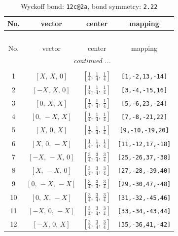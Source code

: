\documentclass[fleqn,8pt]{jsarticle}
\begin{document}
\begin{longtable}{cccc}
\caption{Wyckoff bond: {\tt 12c@2a}, bond symmetry: {\tt 2.22}}
 \\
 \hline \hline
No. & vector & center & mapping \\ \hline \endfirsthead

\multicolumn{3}{l}{\tablename\ \thetable{}} \\
 \hline \hline
No. & vector & center & mapping \\ \hline \endhead

 \hline \hline
\multicolumn{3}{r}{\footnotesize\it continued ...} \\ \endfoot

 \hline \hline
\multicolumn{3}{r}{} \\ \endlastfoot

1 & $\left[ X,\, X,\, 0 \right]$ & $\left[ \frac{1}{4},\, \frac{1}{4},\, \frac{1}{4} \right]$ & {\tt [1,-2,13,-14]} \\ \hline
2 & $\left[ - X,\, X,\, 0 \right]$ & $\left[ \frac{1}{4},\, \frac{1}{4},\, \frac{1}{4} \right]$ & {\tt [3,-4,-15,16]} \\ \hline
3 & $\left[ 0,\, X,\, X \right]$ & $\left[ \frac{1}{4},\, \frac{1}{4},\, \frac{1}{4} \right]$ & {\tt [5,-6,23,-24]} \\ \hline
4 & $\left[ 0,\, - X,\, X \right]$ & $\left[ \frac{1}{4},\, \frac{1}{4},\, \frac{1}{4} \right]$ & {\tt [7,-8,-21,22]} \\ \hline
5 & $\left[ X,\, 0,\, X \right]$ & $\left[ \frac{1}{4},\, \frac{1}{4},\, \frac{1}{4} \right]$ & {\tt [9,-10,-19,20]} \\ \hline
6 & $\left[ X,\, 0,\, - X \right]$ & $\left[ \frac{1}{4},\, \frac{1}{4},\, \frac{1}{4} \right]$ & {\tt [11,-12,17,-18]} \\ \hline
7 & $\left[ - X,\, - X,\, 0 \right]$ & $\left[ \frac{3}{4},\, \frac{3}{4},\, \frac{3}{4} \right]$ & {\tt [25,-26,37,-38]} \\ \hline
8 & $\left[ X,\, - X,\, 0 \right]$ & $\left[ \frac{3}{4},\, \frac{3}{4},\, \frac{3}{4} \right]$ & {\tt [27,-28,-39,40]} \\ \hline
9 & $\left[ 0,\, - X,\, - X \right]$ & $\left[ \frac{3}{4},\, \frac{3}{4},\, \frac{3}{4} \right]$ & {\tt [29,-30,47,-48]} \\ \hline
10 & $\left[ 0,\, X,\, - X \right]$ & $\left[ \frac{3}{4},\, \frac{3}{4},\, \frac{3}{4} \right]$ & {\tt [31,-32,-45,46]} \\ \hline
11 & $\left[ - X,\, 0,\, - X \right]$ & $\left[ \frac{3}{4},\, \frac{3}{4},\, \frac{3}{4} \right]$ & {\tt [33,-34,-43,44]} \\ \hline
12 & $\left[ - X,\, 0,\, X \right]$ & $\left[ \frac{3}{4},\, \frac{3}{4},\, \frac{3}{4} \right]$ & {\tt [35,-36,41,-42]} \\
\end{longtable}
\end{document}
